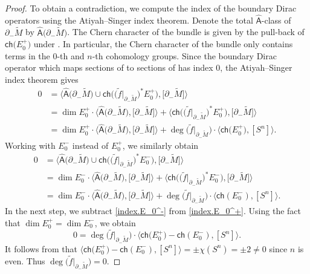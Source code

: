 \documentclass[11pt]{article}
\numberwithin{equation}{section}
\numberwithin{equation}{section}
\begin{document}
\begin{proof}
To obtain a contradiction, we compute the index of the boundary Dirac operators using the Atiyah--Singer index theorem.
Denote the total $\hat{\mathsf{A}}$-class of $\partial_- \tilde{M}$ by $\hat{\mathsf{A}}\big(\partial_- \tilde{M}\big)$. The Chern character of the bundle  is given by the pull-back of $\mathsf{ch}\big(E_0^+\big)$ under . In particular, the Chern character of the bundle  only contains terms in the $0$-th and $n$-th cohomology groups. Since the boundary Dirac operator which maps sections of  to sections of  has index $0$, the Atiyah--Singer index theorem gives
\begin{align}
0
&= \big\langle \hat{\mathsf{A}}\big(\partial_- \tilde{M}\big) \cup \mathsf{ch}\big(\big( \tilde{f}|_{\partial_- \tilde{M}}\big)^* E_0^+\big),\big[\partial_- \tilde{M}\big] \big\rangle\nonumber \\
&= \dim E_0^+ \cdot \big\langle \hat{\mathsf{A}}\big(\partial_- \tilde{M}\big),\big[\partial_- \tilde{M}\big] \big\rangle + \big\langle \mathsf{ch}\big(\big( \tilde{f}|_{\partial_- \tilde{M}}\big)^* E_0^+\big), \big[\partial_- \tilde{M}\big] \big\rangle\nonumber \\
&= \dim E_0^+ \cdot \big\langle \hat{\mathsf{A}}\big(\partial_- \tilde{M}\big),\big[\partial_- \tilde{M}\big] \big\rangle + \deg\big(\tilde{f}|_{\partial_- \tilde{M}}\big) \cdot \big\langle \mathsf{ch}\big(E_0^+\big), [S^n] \big\rangle. \label{index.E_0^+}
\end{align}
Working with $E_0^-$ instead of $E_0^+$, we similarly obtain
\begin{align}
0
&= \big\langle \hat{\mathsf{A}}\big(\partial_- \tilde{M}\big) \cup \mathsf{ch}\big(\big( \tilde{f}|_{\partial_- \tilde{M}}\big)^* E_0^-\big),\big[\partial_- \tilde{M}\big] \big\rangle\nonumber \\
&= \dim E_0^- \cdot \big\langle \hat{\mathsf{A}}\big(\partial_- \tilde{M}\big),\big[\partial_- \tilde{M}\big] \big\rangle + \big\langle \mathsf{ch}\big(\big( \tilde{f}|_{\partial_- \tilde{M}}\big)^* E_0^-\big), \big[\partial_- \tilde{M}\big] \big\rangle \nonumber\\
&= \dim E_0^- \cdot \big\langle \hat{\mathsf{A}}\big(\partial_- \tilde{M}\big),\big[\partial_- \tilde{M}\big] \big\rangle + \deg\big(\tilde{f}|_{\partial_- \tilde{M}}\big) \cdot \big\langle \mathsf{ch}(E_0^-), [S^n] \big\rangle.\label{index.E_0^-}
\end{align}
In the next step, we subtract \eqref{index.E_0^-} from \eqref{index.E_0^+}.
Using the fact that $\dim E_0^+ = \dim E_0^-$, we obtain
\[
 0 = \deg\big(\tilde{f}|_{\partial_- \tilde{M}}\big) \cdot \big\langle \mathsf{ch}\big(E_0^+\big) - \mathsf{ch}(E_0^-), [S^n] \big\rangle.
 \]
It follows from \cite[Proposition~11.24, Chapter~III]{Lawson-Michelsohn} that $\big\langle \mathsf{ch}\big(E_0^+\big) - \mathsf{ch}(E_0^-), [S^n] \big\rangle = \pm \chi(S^n) =\pm 2 \neq 0$ since $n$ is even.
Thus $\deg\big(\tilde{f}|_{\partial_- \tilde{M}}\big)=0$.


\end{proof}
\end{document}
